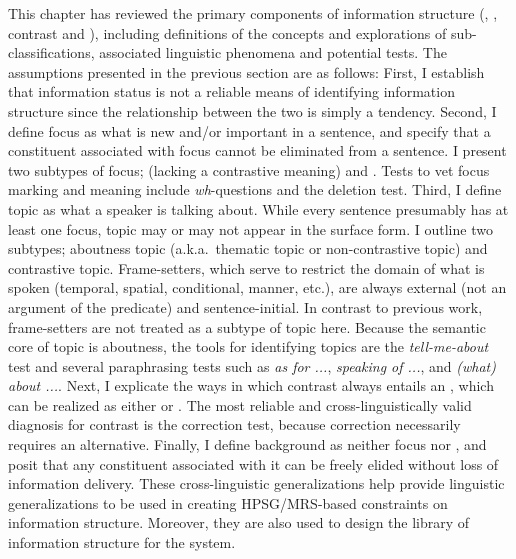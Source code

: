 This chapter has reviewed the primary components of information structure
(, , contrast and ), including definitions
of the concepts and explorations of sub-classifications, associated
linguistic phenomena and potential tests.  The assumptions presented
in the previous section are as follows: First, I establish that
information status is not a reliable means of identifying information
structure since the relationship between the two is simply a tendency.
Second, I define focus as what is new and/or important in a sentence,
and specify that a constituent associated with focus cannot be
eliminated from a sentence. I present two subtypes of focus; 
(lacking a contrastive meaning) and .
Tests to vet focus marking and
meaning include \textit{wh}-questions and the deletion
test. Third, I define topic as what a speaker is
talking about. While every sentence presumably has at least one focus,
topic may or may not appear in the surface form. I outline two
subtypes; aboutness topic (a.k.a.\ thematic topic or non-contrastive
topic) and contrastive topic. Frame-setters, which serve to restrict
the domain of what is spoken (temporal, spatial, conditional, manner,
etc.), are always external (not an argument of the predicate) and
sentence-initial.  In contrast to previous work, frame-setters are not
treated as a subtype of topic here.  Because the semantic core of
topic is aboutness, the tools for identifying topics are the
\textit{tell-me-about} test and several paraphrasing tests such as
\textit{as for ...}, \textit{speaking of ...}, and \textit{(what)
  about ...}. Next, I explicate the
ways in which contrast always entails an , which
can be realized as either  or . The
most reliable and cross-linguistically valid diagnosis for contrast is
the correction test, because correction
necessarily requires an alternative. Finally, I define background as
neither focus nor , and posit that any constituent associated
with it can be freely elided without loss of information
delivery. These cross-linguistic generalizations help provide
linguistic generalizations to be used in creating HPSG/MRS-based
constraints on information structure. Moreover, they
are also used to design the library of information structure for the
\lingo {} system.



